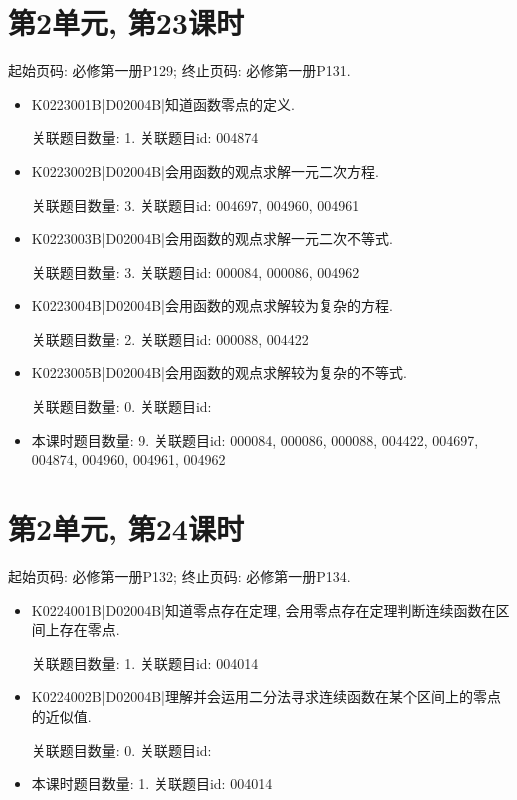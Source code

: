 \section*{第2单元, 第23课时}
起始页码: 必修第一册P129; 终止页码: 必修第一册P131.
\begin{itemize}
\item K0223001B|D02004B|知道函数零点的定义.

关联题目数量: 1. 关联题目id: 004874

\item K0223002B|D02004B|会用函数的观点求解一元二次方程.

关联题目数量: 3. 关联题目id: 004697, 004960, 004961

\item K0223003B|D02004B|会用函数的观点求解一元二次不等式.

关联题目数量: 3. 关联题目id: 000084, 000086, 004962

\item K0223004B|D02004B|会用函数的观点求解较为复杂的方程.

关联题目数量: 2. 关联题目id: 000088, 004422

\item K0223005B|D02004B|会用函数的观点求解较为复杂的不等式.

关联题目数量: 0. 关联题目id: 

\item 本课时题目数量: 9. 关联题目id: 000084, 000086, 000088, 004422, 004697, 004874, 004960, 004961, 004962

\end{itemize}

\section*{第2单元, 第24课时}
起始页码: 必修第一册P132; 终止页码: 必修第一册P134.
\begin{itemize}
\item K0224001B|D02004B|知道零点存在定理, 会用零点存在定理判断连续函数在区间上存在零点.

关联题目数量: 1. 关联题目id: 004014

\item K0224002B|D02004B|理解并会运用二分法寻求连续函数在某个区间上的零点的近似值.

关联题目数量: 0. 关联题目id: 

\item 本课时题目数量: 1. 关联题目id: 004014

\end{itemize}

